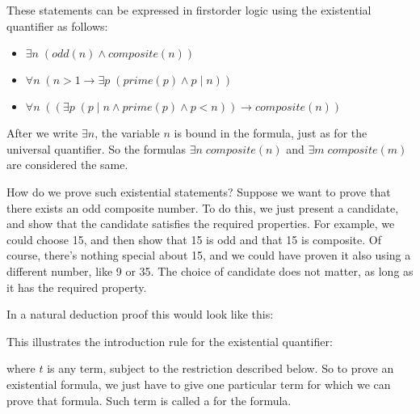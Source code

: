 \documentclass[letterpaper,10pt,english]{sphinxmanual}
\begin{document}
\sphinxAtStartPar
These statements can be expressed in first\sphinxhyphen{}order logic using the existential quantifier as follows:
\begin{itemize}
\item {} 
\sphinxAtStartPar
\(\exists n\;  (\mathit{odd}(n) \wedge \mathit{composite}(n))\)

\item {} 
\sphinxAtStartPar
\(\forall n \; (n > 1 \to \exists p \; (\mathit{prime}(p) \wedge p \mid n))\)

\item {} 
\sphinxAtStartPar
\(\forall n \; ((\exists p \; (p \mid n \wedge \mathit{prime}(p) \wedge p < n)) \to \mathit{composite}(n))\)

\end{itemize}

\sphinxAtStartPar
After we write \(\exists n\), the variable \(n\) is bound in the formula, just as for the universal quantifier. So the formulas \(\exists n \; \mathit{composite}(n)\) and \(\exists m \; \mathit{composite}(m)\) are considered the same.

\sphinxAtStartPar
How do we prove such existential statements? Suppose we want to prove that there exists an odd composite number. To do this, we just present a candidate, and show that the candidate satisfies the required properties. For example, we could choose 15, and then show that 15 is odd and that 15 is composite. Of course, there’s nothing special about 15, and we could have proven it also using a different number, like 9 or 35. The choice of candidate does not matter, as long as it has the required property.

\sphinxAtStartPar
In a natural deduction proof this would look like this:



\begin{center}
\AXM{\vdots}
\noLine
{}
\DP
\end{center}

\sphinxAtStartPar
This illustrates the introduction rule for the existential quantifier:



\begin{center}
\DP
\end{center}

\sphinxAtStartPar
where \(t\) is any term, subject to the restriction described below. So to prove an existential formula, we just have to give one particular term for which we can prove that formula. Such term is called a  for the formula.
\end{document}

